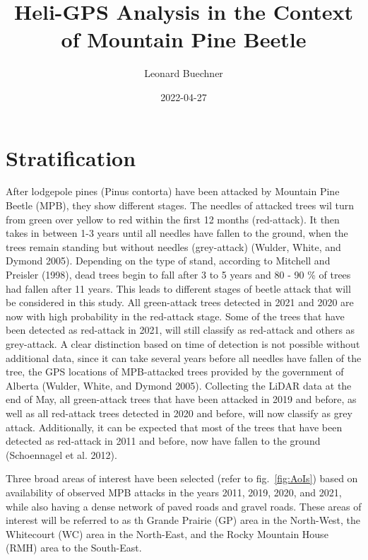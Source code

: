 \documentclass[
]{article}
\title{Heli-GPS Analysis in the Context of Mountain Pine Beetle}
\author{Leonard Buechner}
\date{2022-04-27}
\begin{document}
\maketitle

{
\setcounter{tocdepth}{2}
\tableofcontents
}
\hypertarget{stratification}{%
\section{Stratification}\label{stratification}}

After lodgepole pines (Pinus contorta) have been attacked by Mountain Pine Beetle (MPB), they show different stages. The needles of attacked trees wil turn from green over yellow to red within the first 12 months (red-attack). It then takes in between 1-3 years until all needles have fallen to the ground, when the trees remain standing but without needles (grey-attack) (Wulder, White, and Dymond 2005). Depending on the type of stand, according to Mitchell and Preisler (1998), dead trees begin to fall after 3 to 5 years and 80 - 90 \% of trees had fallen after 11 years.
This leads to different stages of beetle attack that will be considered in this study. All green-attack trees detected in 2021 and 2020 are now with high probability in the red-attack stage. Some of the trees that have been detected as red-attack in 2021, will still classify as red-attack and others as grey-attack. A clear distinction based on time of detection is not possible without additional data, since it can take several years before all needles have fallen of the tree, the GPS locations of MPB-attacked trees provided by the government of Alberta (Wulder, White, and Dymond 2005). Collecting the LiDAR data at the end of May, all green-attack trees that have been attacked in 2019 and before, as well as all red-attack trees detected in 2020 and before, will now classify as grey attack. Additionally, it can be expected that most of the trees that have been detected as red-attack in 2011 and before, now have fallen to the ground (Schoennagel et al. 2012).

Three broad areas of interest have been selected (refer to fig.~\ref{fig:AoIs}) based on availability of observed MPB attacks in the years 2011, 2019, 2020, and 2021, while also having a dense network of paved roads and gravel roads. These areas of interest will be referred to as th Grande Prairie (GP) area in the North-West, the Whitecourt (WC) area in the North-East, and the Rocky Mountain House (RMH) area to the South-East.
\end{document}
